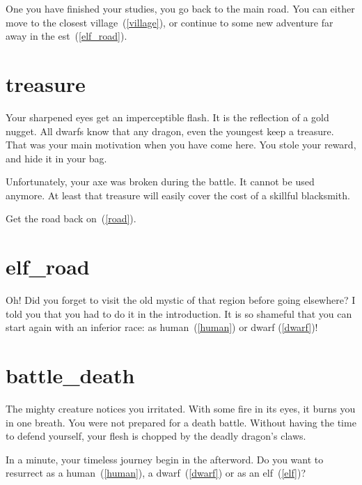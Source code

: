 One you have finished your studies, you go back to the main road. You can either
move to the closest village~(\ref{village}), or continue to some new adventure
far away in the est~(\ref{elf_road}).

\section{treasure}

Your sharpened eyes get an imperceptible flash. It is the reflection of a gold
nugget. All dwarfs know that any dragon, even the youngest keep a treasure. That
was your main motivation when you have come here. You stole your reward, and hide it
in your bag.

Unfortunately, your axe was broken during the battle. It cannot be used anymore.
At least that treasure will easily cover the cost of a skillful blacksmith.

Get the road back on~(\ref{road}).


\section{elf_road}

Oh! Did you forget to visit the old mystic of that region before going
elsewhere? I told you that you had to do it in the introduction. It is so
shameful that you can start again with an inferior race: as human~(\ref{human})
or dwarf (\ref{dwarf})!

\section{battle_death}

The mighty creature notices you irritated. With some fire in its eyes, it burns
you in one breath. You were not prepared for a death battle. Without having the
time to defend yourself, your flesh is chopped by the deadly dragon's claws.

\medbreak

In a minute, your timeless journey begin in the afterword. Do you want to resurrect
as a human~(\ref{human}), a dwarf~(\ref{dwarf}) or as an elf~(\ref{elf})?
